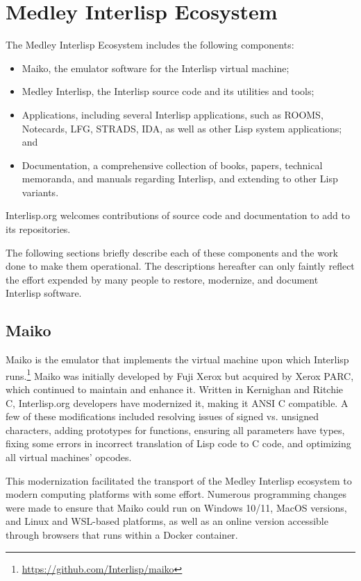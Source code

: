 \documentclass[sigconf]{acmart}
\begin{document}
\section{Medley Interlisp Ecosystem}

The Medley Interlisp Ecosystem includes the following components:

\begin{itemize}
  \item Maiko, the emulator software for the Interlisp virtual machine;
  \item Medley Interlisp, the Interlisp source code and its utilities and tools;
  \item Applications, including several Interlisp applications, such as ROOMS, Notecards, LFG, STRADS, IDA, as well as other Lisp system applications; and
  \item Documentation, a comprehensive collection of books, papers, technical memoranda, and manuals regarding Interlisp, and extending to other Lisp variants.
\end{itemize}

Interlisp.org welcomes contributions of source code and documentation to add to its repositories.

The following sections briefly describe each of these components and the work done to make them operational. The descriptions hereafter can only faintly reflect the effort expended by many people to restore, modernize, and document Interlisp software.

\subsection{Maiko}

Maiko is the emulator that implements the virtual machine upon which Interlisp runs.\footnote{\url{https://github.com/Interlisp/maiko}} Maiko was initially developed by Fuji Xerox but acquired by Xerox PARC, which continued to maintain and enhance it. Written in Kernighan and Ritchie C, Interlisp.org developers have modernized it, making it ANSI C compatible. A few of these modifications included resolving issues of signed vs. unsigned characters, adding prototypes for functions, ensuring all parameters have types, fixing some errors in incorrect translation of Lisp code to C code, and optimizing all virtual machines' opcodes. 

This modernization facilitated the transport of the Medley Interlisp ecosystem to modern computing platforms with some effort. Numerous programming changes were made to ensure that Maiko could run on Windows 10/11, MacOS versions, and Linux and WSL-based platforms, as well as an online version accessible through browsers that runs within a Docker container.
 
\end{document}
